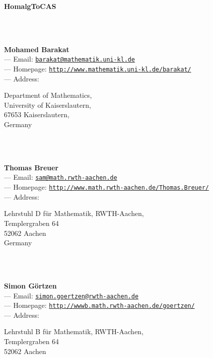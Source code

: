 \documentclass[a4paper,11pt]{report}
\begin{document}
\begin{titlepage}
\begin{center}{\Huge \textbf{\textsf{HomalgToCAS}\mbox{}}}
\end{center}\vfill

\mbox{}\\
{\mbox{}\\
\small \noindent \textbf{Mohamed Barakat\\
    } --- Email: \href{mailto://barakat@mathematik.uni-kl.de} {\texttt{barakat@mathematik.uni-kl.de}}\\
 --- Homepage: \href{http://www.mathematik.uni-kl.de/~barakat/} {\texttt{http://www.mathematik.uni-kl.de/\texttt{}barakat/}}\\
 --- Address: \begin{minipage}[t]{8cm}\noindent
 Department of Mathematics, \\
 University of Kaiserslautern, \\
 67653 Kaiserslautern, \\
 Germany \end{minipage}
}\\
{\mbox{}\\
\small \noindent \textbf{Thomas Breuer\\
    } --- Email: \href{mailto://sam@math.rwth-aachen.de} {\texttt{sam@math.rwth-aachen.de}}\\
 --- Homepage: \href{http://www.math.rwth-aachen.de/~Thomas.Breuer/} {\texttt{http://www.math.rwth-aachen.de/\texttt{}Thomas.Breuer/}}\\
 --- Address: \begin{minipage}[t]{8cm}\noindent
 Lehrstuhl D f{\"u}r Mathematik, RWTH-Aachen,\\
 Templergraben 64\\
 52062 Aachen\\
 Germany \end{minipage}
}\\
{\mbox{}\\
\small \noindent \textbf{Simon G{\"o}rtzen\\
    } --- Email: \href{mailto://simon.goertzen@rwth-aachen.de} {\texttt{simon.goertzen@rwth-aachen.de}}\\
 --- Homepage: \href{http://wwwb.math.rwth-aachen.de/goertzen/} {\texttt{http://wwwb.math.rwth-aachen.de/goertzen/}}\\
 --- Address: \begin{minipage}[t]{8cm}\noindent
 Lehrstuhl B f{\"u}r Mathematik, RWTH-Aachen,\\
 Templergraben 64\\
 52062 Aachen\\

\end{minipage}}
\end{titlepage}
\end{document}
